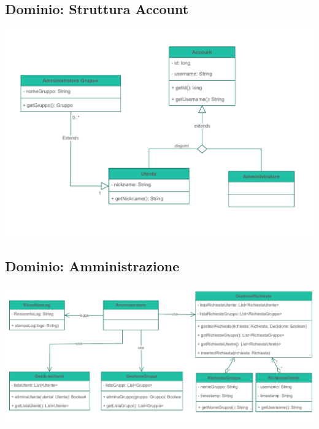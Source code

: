 \subsection*{Dominio: Struttura Account}
{}
\vspace{0.5cm}
\begin{adjustwidth}{-2cm}{0cm}
\includegraphics[scale=0.9]{progettazione/Progettazione-Struttura Account.drawio.pdf}
\end{adjustwidth}
\vspace{1cm}

\subsection*{Dominio: Amministrazione}
{}
\vspace{0.5cm}
\begin{adjustwidth}{-3.5cm}{0cm}
\includegraphics[scale=0.9]{progettazione/Progettazione-Amministrazione.drawio.pdf}
\end{adjustwidth}
\vspace{1cm}

